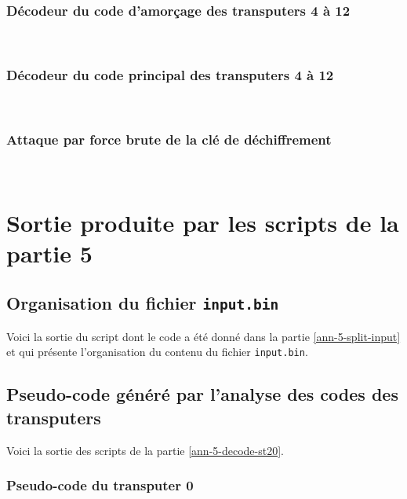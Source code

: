 \documentclass[a4paper,10pt]{article}
\newcommand{\pyinput}[1]{%
    \noindent{\color[rgb]{0.5, 0.5, 0.5}{\rule{\textwidth}{0.4pt}}}
     \\
    \noindent{\color[rgb]{0.5, 0.5, 0.5}{\rule{\textwidth}{0.4pt}}}
}
\begin{document}
\begin{appendices}
\subsubsection{Décodeur du code d'amorçage des transputers 4 à 12}
\label{ann-5-decode-loader}

\pyinput{stage5/decode_loader.py.inc.tex}

\subsubsection{Décodeur du code principal des transputers 4 à 12}
\label{ann-5-decode-main}

\pyinput{stage5/decode_all_main.py.inc.tex}

\subsubsection{Attaque par force brute de la clé de déchiffrement}
\label{ann-5-brute}

\pyinput{stage5/decrypt.c.inc.tex}

\clearpage
\section{Sortie produite par les scripts de la partie 5}

\subsection{Organisation du fichier \texttt{input.bin}}
\label{ann-5-split-input-out}

Voici la sortie du script dont le code a été donné dans la partie \ref{ann-5-split-input} et qui présente l'organisation du contenu du fichier \texttt{input.bin}.



\subsection{Pseudo-code généré par l'analyse des codes des transputers}

Voici la sortie des scripts de la partie \ref{ann-5-decode-st20}.

\subsubsection{Pseudo-code du transputer 0}
\label{ann-5-decode-trans0-out}


\end{appendices}
\end{document}
